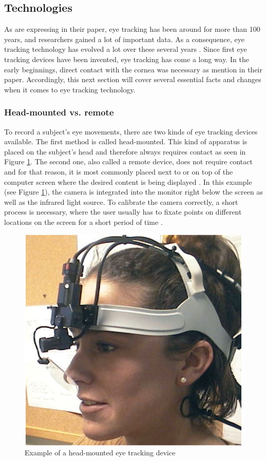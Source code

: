\subsection{Technologies}
\label{subsection:Technologies}
As \textcite[]{biedert2010eyebook} are expressing in their paper, eye tracking has been around for more than 100 years, and researchers gained a lot of important data. As a consequence, eye tracking technology has evolved a lot over these several years \autocite[]{poole2006eye}.
Since first eye tracking devices have been invented, eye tracking has come a long way. In the early beginnings, direct contact with the cornea was necessary as \textcite[]{jacob2003eye} mention in their paper.
Accordingly, this next section will cover several essential facts and changes when it comes to eye tracking technology.

\subsubsection{Head-mounted vs. remote}
To record a subject's eye movements, there are two kinds of eye tracking devices available. The first method is called head-mounted. This kind of apparatus is placed on the subject's head and therefore always requires contact as seen in Figure \ref{figure:HeadMounted}. 
The second one, also called a remote device, does not require contact and for that reason, it is most commonly placed next to or on top of the computer screen where the desired content is being displayed \autocite[]{jacob2003eye, schiessl2003eye}. In this example (see Figure \ref{figure:HeadMounted}), the camera is integrated into the monitor right below the screen as well as the infrared light source. 
To calibrate the camera correctly, a short process is necessary, where the user usually has to fixate points on different locations on the screen for a short period of time \autocite{biedert2010eyebook}.

\begin{figure}[!ht]
    \centering
    \includegraphics[width=0.75\linewidth]{images/headmounted_goldberg2003eye.png}
    \caption{
        Example of a head-mounted eye tracking device \autocite[12]{goldberg2003eye}
    }
    \label{figure:HeadMounted}
\end{figure}

